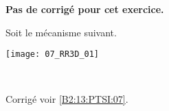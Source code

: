 \normaltrue \difficilefalse \tdifficilefalse
\correctionfalse


\setcounter{question}{0}
\ifcorrection
\else
\textbf{Pas de corrigé pour cet exercice.}
\fi

\ifprof
\else
Soit le mécanisme suivant. 
\begin{center}
\texttt{[image: 07\_RR3D\_01]}
\end{center}
\fi

\ifprof ~\\

\else
\fi





\ifprof
\else
\footnotesize

\normalsize

\begin{flushright}
\footnotesize{Corrigé  voir \ref{B2:13:PTSI:07}.}
\end{flushright}%
\fi